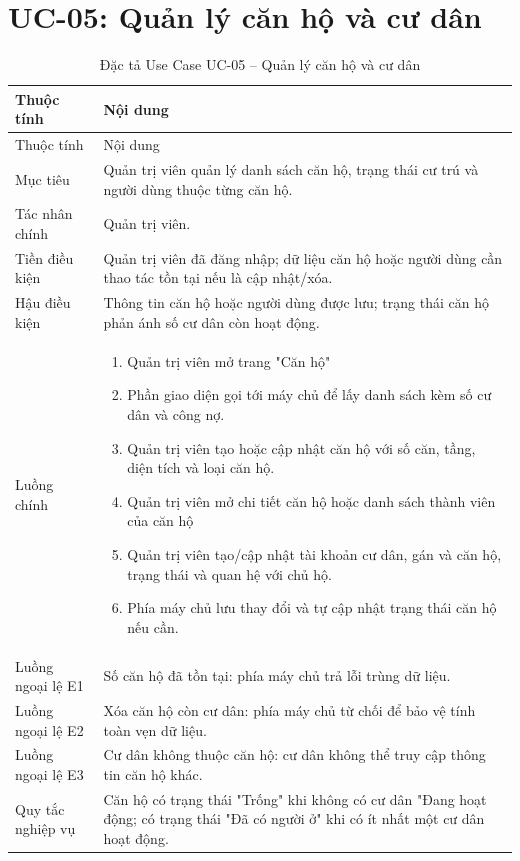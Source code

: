 ﻿\documentclass[12pt,a4paper]{report}
\begin{document}
\section{UC-05: Quản lý căn hộ và cư dân}
\begin{longtable}{L{4cm} L{10.5cm}}
\caption{Đặc tả Use Case UC-05 -- Quản lý căn hộ và cư dân}\label{tab:uc-apartment}\\
\toprule
Thuộc tính & Nội dung \\
\midrule
\endfirsthead
\toprule Thuộc tính & Nội dung \\\midrule
\endhead
Mục tiêu & Quản trị viên quản lý danh sách căn hộ, trạng thái cư trú và người dùng thuộc từng căn hộ. \\
Tác nhân chính & Quản trị viên. \\
Tiền điều kiện & Quản trị viên đã đăng nhập; dữ liệu căn hộ hoặc người dùng cần thao tác tồn tại nếu là cập nhật/xóa. \\
Hậu điều kiện & Thông tin căn hộ hoặc người dùng được lưu; trạng thái căn hộ phản ánh số cư dân còn hoạt động. \\
Luồng chính & \begin{enumerate}
\item Quản trị viên mở trang "Căn hộ"
\item Phần giao diện gọi tới máy chủ để lấy danh sách kèm số cư dân và công nợ.
\item Quản trị viên tạo hoặc cập nhật căn hộ với số căn, tầng, diện tích và loại căn hộ.
\item Quản trị viên mở chi tiết căn hộ hoặc danh sách thành viên của căn hộ
\item Quản trị viên tạo/cập nhật tài khoản cư dân, gán và căn hộ, trạng thái và quan hệ với chủ hộ.
\item Phía máy chủ lưu thay đổi và tự cập nhật trạng thái căn hộ nếu cần.
\end{enumerate} \\
Luồng ngoại lệ E1 & Số căn hộ đã tồn tại: phía máy chủ trả lỗi trùng dữ liệu. \\
Luồng ngoại lệ E2 & Xóa căn hộ còn cư dân: phía máy chủ từ chối để bảo vệ tính toàn vẹn dữ liệu. \\
Luồng ngoại lệ E3 & Cư dân không thuộc căn hộ: cư dân không thể truy cập thông tin căn hộ khác. \\
Quy tắc nghiệp vụ & Căn hộ có trạng thái "Trống" khi không có cư dân "Đang hoạt động; có trạng thái "Đã có người ở" khi có ít nhất một cư dân hoạt động. \\
\bottomrule
\end{longtable}
\end{document}
